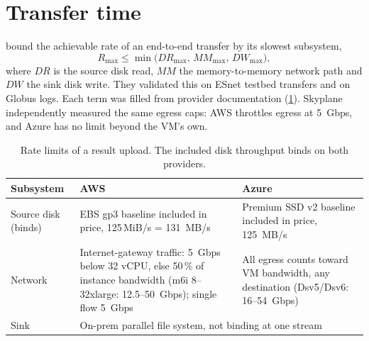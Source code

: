 \documentclass[11pt,a4paper]{article}
\begin{document}
\section{Transfer time}\label{sec:transfer}
\citet{liu2017explaining} bound the achievable rate of an end-to-end transfer by its
slowest subsystem,
\begin{equation}
  R_{\max} \le \min\bigl(DR_{\max},\, MM_{\max},\, DW_{\max}\bigr),
\end{equation}
where $DR$ is the source disk read, $MM$ the memory-to-memory network path and $DW$
the sink disk write. They validated this on ESnet testbed transfers and on Globus
logs. Each term was filled from provider documentation (\cref{tab:bottleneck}).
Skyplane \citep{jain2023skyplane} independently measured the same egress caps:
AWS throttles egress at \SI{5}{Gbps}, and Azure has no limit beyond the VM's own.

\begin{table}[ht]
\centering\small
\caption{Rate limits of a result upload. The included disk throughput binds on both
providers.}\label{tab:bottleneck}
\begin{tabularx}{\linewidth}{lXX}
\toprule
Subsystem & AWS & Azure \\
\midrule
Source disk (binds) & EBS gp3 baseline included in price, 125\,MiB/s = \SI{131}{MB/s} \citep{aws-ebs} &
  Premium SSD v2 baseline included in price, \SI{125}{MB/s} \citep{azure-disks} \\
Network & Internet-gateway traffic: \SI{5}{Gbps} below 32 vCPU, else 50\,\% of instance
  bandwidth (m6i 8--32xlarge: 12.5--\SI{50}{Gbps}); single flow \SI{5}{Gbps}
  \citep{aws-bandwidth,aws-gp} &
  All egress counts toward VM bandwidth, any destination (Dsv5/Dsv6: 16--\SI{54}{Gbps})
  \citep{azure-bandwidth,azure-sizes} \\
Sink & \multicolumn{2}{l}{On-prem parallel file system, not binding at one stream} \\
\bottomrule
\end{tabularx}
\end{table}
\end{document}
